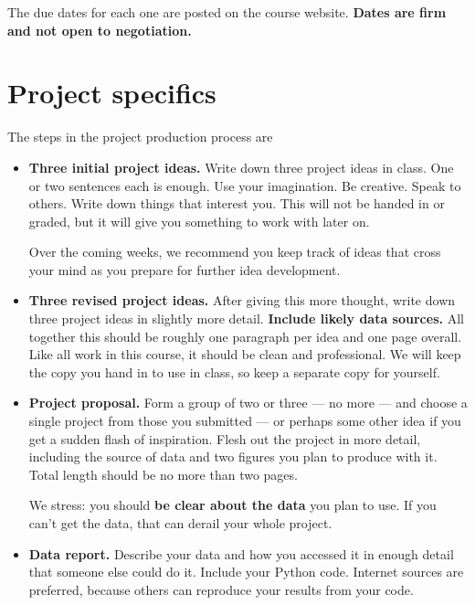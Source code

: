 \documentclass[11pt]{article}
\begin{document}
The due dates for each one are posted on the course website.
{\bf Dates are firm and not open to negotiation.}


\section*{Project specifics}

The steps in the project production process are
\begin{itemize}

\item {\bf Three initial project ideas.}
Write down three project ideas in class.
One or two sentences each is enough.
Use your imagination.  Be creative.  Speak to others.
Write down things that interest you.
This will not be handed in or graded, but it will give you something to work with later on.

Over the coming weeks, we recommend you keep track of ideas that cross
your mind as you prepare for further idea development.


\item {\bf Three revised project ideas.}
After giving this more thought, write down three project ideas in slightly more detail.
{\bf Include likely data sources.}
All together this should be roughly one paragraph per idea and one page overall.
Like all work in this course, it should be clean and professional.
We will keep the copy you hand in to use in class, so keep a separate copy for yourself.

\item{\bf Project proposal.}
Form a group of two or three --- no more ---
and choose a single project from those you submitted ---
or perhaps some other idea if you get a sudden flash of inspiration.
Flesh out the project in more detail, including the source of data and
two figures you plan to produce with it.
Total length should be no more than two pages.

We stress:  you should {\bf be clear about the data} you plan to use.
If you can't get the data, that can derail your whole project.

\item {\bf Data report.}
Describe your data and how you accessed it in enough detail that someone else could do it.
Include your Python code.  %
Internet sources are preferred, because others can reproduce your results from your code.



\end{itemize}
\end{document}
